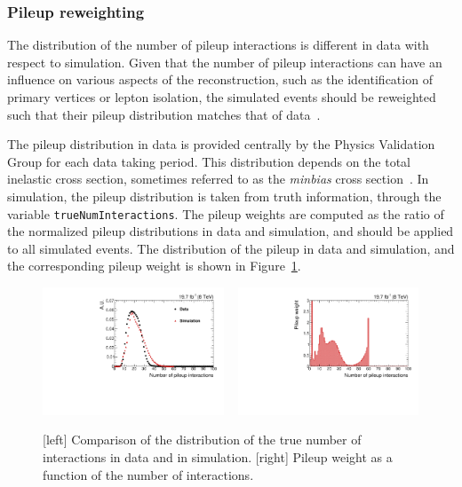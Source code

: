 
\subsubsection{Pileup reweighting \label{sec:event_pileup}}

The distribution of the number of pileup interactions is different in data with respect to
simulation. Given that the number of pileup interactions can have an influence on various aspects of
the reconstruction, such as the identification of primary vertices or lepton isolation, 
the simulated events should be reweighted such that their pileup distribution matches that of
data~\cite{pileup_twiki}.

The pileup distribution in data is provided centrally by the Physics Validation Group for each
data taking period. This distribution depends on the total \Pp\Pp inelastic cross section, sometimes
referred to as the \textit{minbias} cross section~\cite{Field:2012jv}. 
In simulation, the pileup distribution is taken from truth information, through the variable
\texttt{trueNumInteractions}. 
The pileup weights are computed as the ratio of the normalized pileup distributions in data and
simulation, and should be applied to all simulated events.
The distribution of the pileup in data and simulation, and the corresponding pileup weight is
shown in Figure~\ref{fig:pileup_comparison}. 

\begin{figure}[htpb]
 \centering
 \includegraphics[width=0.48\textwidth]{figures/eventreco_reweighting/pileup_comparison}
 ~
 \includegraphics[width=0.48\textwidth]{figures/eventreco_reweighting/pileup_weight_comparison}
\caption{[left] Comparison of the distribution of the true number of interactions in data and in
simulation. 
[right] Pileup weight as a function of the number of interactions. 
\label{fig:pileup_comparison}}
\end{figure}


